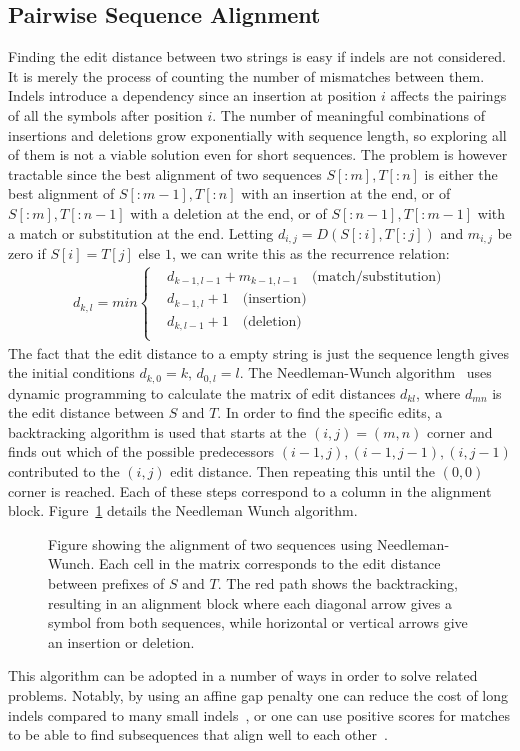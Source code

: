 \subsection{Pairwise Sequence Alignment}
\label{sec:pairwise}
Finding the edit distance between two strings is easy if indels are not considered.
It is merely the process of counting the number of mismatches between them.
Indels introduce a dependency since an insertion at position $i$ affects the pairings of all the symbols after position $i$.
The number of meaningful combinations of insertions and deletions grow exponentially with sequence length, so exploring all of them is not a viable solution even for short sequences.
The problem is however tractable since the best alignment of two sequences $S[:m], T[:n]$ is either the best alignment of $S[:m-1], T[:n]$ with an insertion at the end, or of $S[:m], T[:n-1]$ with a deletion at the end, or of $S[:n-1], T[:m-1]$ with a match or substitution at the end. 
Letting $d_{i,j} = D(S[:i], T[:j])$ and $m_{i,j}$ be zero if $S[i]=T[j]$ else $1$, we can write this as the recurrence relation:
\begin{align*}
  d_{k,l} = min\begin{cases}
  &d_{k-1,l-1}+m_{k-1, l-1}\quad \text{(match/substitution)}\\
  &d_{k-1,l}+1 \quad \text{(insertion)}\\
  &d_{k, l-1}+1 \quad \text{(deletion)}\\
\end{cases}
\end{align*}
The fact that the edit distance to a empty string is just the sequence length gives the initial conditions $d_{k, 0}=k,\,d_{0,l}=l$.
The Needleman-Wunch algorithm~\cite{needlemanwunch} uses dynamic programming to calculate the matrix of edit distances $d_{kl}$, where $d_{mn}$ is the edit distance between $S$ and $T$.
In order to find the specific edits, a backtracking algorithm is used that starts at the $(i, j) = (m, n)$ corner and finds out which of the possible predecessors $(i-1, j), (i-1, j-1), (i, j-1)$ contributed to the $(i, j)$ edit distance.
Then repeating this until the $(0, 0)$ corner is reached. Each of these steps correspond to a column in the alignment block.
Figure~\ref{fig:needle} details the Needleman Wunch algorithm.
\begin{figure}
  \begin{tikzpicture}
    
  \end{tikzpicture}
  \caption{Figure showing the alignment of two sequences using Needleman-Wunch. Each cell in the matrix corresponds to the edit distance between prefixes of $S$ and $T$. The red path shows the backtracking, resulting in an alignment block where each diagonal arrow gives a symbol from both sequences, while horizontal or vertical arrows give an insertion or deletion.}
  \label{fig:needle}
\end{figure}
This algorithm can be adopted in a number of ways in order to solve related problems.
Notably, by using an affine gap penalty one can reduce the cost of long indels compared to many small indels~\cite{affine}, or one can use positive scores for matches to be able to find subsequences that align well to each other~\cite{smithwaterman}.

